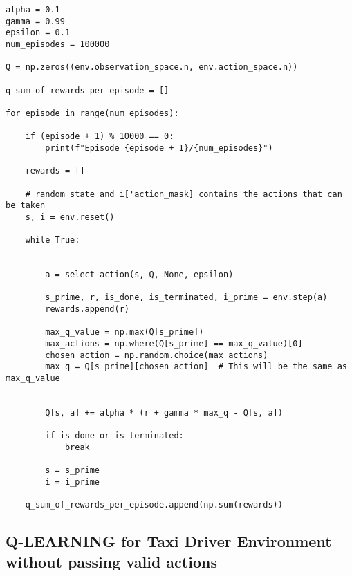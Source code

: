 \documentclass[11pt,a4paper]{article}
\begin{document}
\begin{lstlisting}
alpha = 0.1
gamma = 0.99
epsilon = 0.1
num_episodes = 100000

Q = np.zeros((env.observation_space.n, env.action_space.n))

q_sum_of_rewards_per_episode = []

for episode in range(num_episodes):

    if (episode + 1) % 10000 == 0:
        print(f"Episode {episode + 1}/{num_episodes}")

    rewards = []

    # random state and i['action_mask] contains the actions that can be taken
    s, i = env.reset()

    while True:


        a = select_action(s, Q, None, epsilon)

        s_prime, r, is_done, is_terminated, i_prime = env.step(a)
        rewards.append(r)

        max_q_value = np.max(Q[s_prime])
        max_actions = np.where(Q[s_prime] == max_q_value)[0]
        chosen_action = np.random.choice(max_actions)
        max_q = Q[s_prime][chosen_action]  # This will be the same as max_q_value


        Q[s, a] += alpha * (r + gamma * max_q - Q[s, a])

        if is_done or is_terminated:
            break

        s = s_prime
        i = i_prime
    
    q_sum_of_rewards_per_episode.append(np.sum(rewards))
\end{lstlisting}

\subsection{Q-LEARNING for Taxi Driver Environment without passing valid actions}
\end{document}
